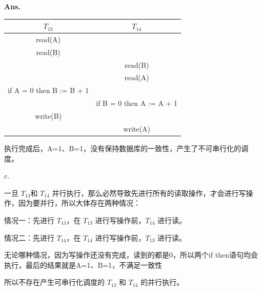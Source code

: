 \documentclass[12pt, a4paper, UTF8, fontset=windows]{ctexbook}
\newenvironment{solution}{\par\noindent\textbf{Ans.}}{\par}
\begin{document}
\begin{solution}
\begin{table}[h]
    \centering
    \begin{tabular}{|c|c|} \hline
        $T_{13}$ & $T_{14}$  \\ \hline
        read(A) &  \\ \hline
        read(B) &  \\ \hline
        & read(B)  \\ \hline
        & read(A) \\ \hline
        if A = 0 then B := B + 1 &  \\ \hline
        & if B = 0 then A := A + 1 \\ \hline
        write(B) &  \\ \hline
        & write(A) \\ \hline
    \end{tabular}
\end{table}

执行完成后，A=1、B=1，没有保持数据库的一致性，产生了不可串行化的调度。

c.

一旦 $T_{13} $和 $T_{14}$ 并行执行，那么必然导致先进行所有的读取操作，才会进行写操作，因为要并行，所以大体存在两种情况：

情况一：先进行 $T_{13}$，在 $T_{13}$ 进行写操作前，$T_{14}$ 进行读。

情况二：先进行 $T_{14}$，在 $T_{14}$ 进行写操作前，$T_{13}$ 进行读。

无论哪种情况，因为写操作还没有完成，读到的都是0，所以两个if then语句均会执行，最后的结果就是A=1、B=1，不满足一致性

所以不存在产生可串行化调度的 $T_{13}$ 和 $T_{14}$ 的并行执行。

\end{solution}
\end{document}
